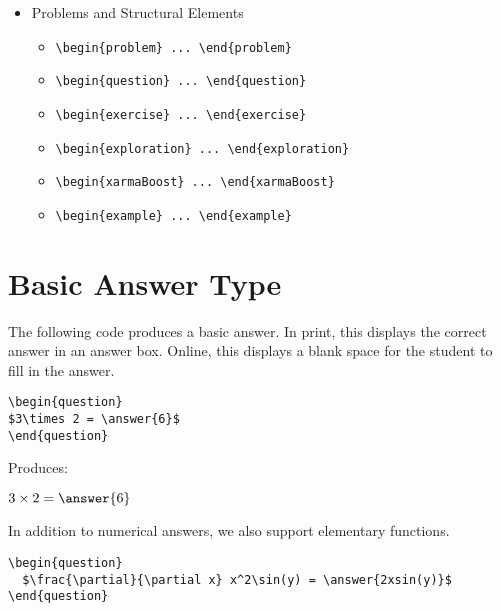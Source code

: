 \documentclass{ximera}
\begin{document}
\begin{itemize}
\item Problems and Structural Elements
  \begin{itemize}
    \item \verb!\begin{problem} ... \end{problem}!
    \item \verb!\begin{question} ... \end{question}!
    \item \verb!\begin{exercise} ... \end{exercise}!
    \item \verb!\begin{exploration} ... \end{exploration}!
    \item \verb!\begin{xarmaBoost} ... \end{xarmaBoost}!
    \item \verb!\begin{example} ... \end{example}!
  \end{itemize}
\end{itemize}

\section{Basic Answer Type}

The following code produces a basic answer. In print, this displays the correct answer in an answer box. Online, this displays a blank space for the student to fill in the answer. 

\begin{verbatim}
\begin{question}
$3\times 2 = \answer{6}$
\end{question}
\end{verbatim}

Produces:

\begin{question}
$3\times 2 = \answer{6}$
\end{question}

In addition to numerical answers, we also support elementary functions.

\begin{verbatim}
\begin{question}
  $\frac{\partial}{\partial x} x^2\sin(y) = \answer{2xsin(y)}$
\end{question}
\end{verbatim}
\end{document}
